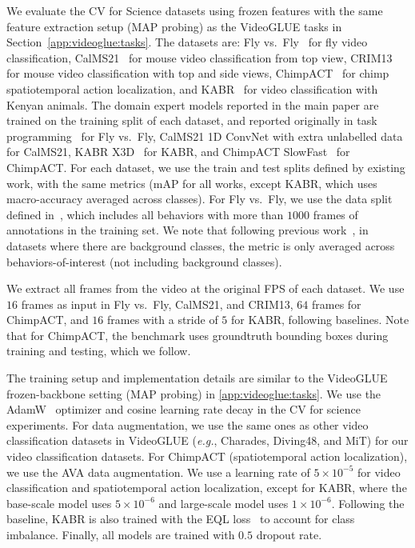 \documentclass{article}
\theoremstyle{plain}
\theoremstyle{definition}
\theoremstyle{remark}
\newcommand{\eg}{\textit{e.g.}\xspace}
\begin{document}
We evaluate the CV for Science datasets using frozen features with the same feature extraction setup (MAP probing) as the VideoGLUE tasks in Section~\ref{app:videoglue:tasks}. 
The datasets are: Fly vs.\ Fly~\cite{eyjolfsdottir2014detecting} for fly video classification, CalMS21~\cite{sun2021multi} for mouse video classification from top view, CRIM13~\cite{burgos2012social} for mouse video classification with top and side views, ChimpACT~\cite{ma2023chimpact} for chimp spatiotemporal action localization, and KABR~\cite{kholiavchenko2024kabr}  for video classification with Kenyan animals.
The domain expert models reported in the main paper are trained on the training split of each dataset, and reported originally in task programming~\cite{sun2021task} for Fly vs.\ Fly, CalMS21 1D ConvNet with extra unlabelled data~\cite{sun2021multi} for CalMS21, KABR X3D~\cite{kholiavchenko2024kabr} for KABR, and ChimpACT SlowFast~\cite{ma2023chimpact} for ChimpACT.
For each dataset, we use the train and test splits defined by existing work, with the same metrics (mAP for all works, except KABR, which uses macro-accuracy averaged across classes). For Fly vs.\ Fly, we use the data split defined in~\citet{sun2021task}, which includes all behaviors with more than $1000$ frames of annotations in the training set. We note that following previous work~\cite{sun2021multi,sun2021task}, in datasets where there are background classes, the metric is only averaged across behaviors-of-interest (not including background classes).

We extract all frames from the video at the original FPS of each dataset. We use $16$ frames as input in Fly vs.\ Fly, CalMS21, and CRIM13, $64$ frames for ChimpACT, and $16$ frames with a stride of $5$ for KABR, following baselines. Note that for ChimpACT, the benchmark uses groundtruth bounding boxes during training and testing, which we follow. 

The training setup and implementation details are similar to the VideoGLUE frozen-backbone setting (MAP probing) in \cref{app:videoglue:tasks}.
We use the AdamW~\cite{loshchilov2017adamw} optimizer and cosine learning rate decay in the CV for science experiments.
For data augmentation, we use the same ones as other video classification datasets in VideoGLUE (\eg, Charades, Diving48, and MiT) for our video classification datasets. For ChimpACT (spatiotemporal action localization), we use the AVA data augmentation. We use a learning rate of $5 \times 10^{-5}$ for video classification and spatiotemporal action localization, except for KABR, where the base-scale model uses $5 \times 10^{-6}$ and large-scale model uses $1 \times 10^{-6}$. Following the baseline, KABR is also trained with the EQL loss~\cite{tan2020equalization} to account for class imbalance. Finally, all models are trained with $0.5$ dropout rate. 
\end{document}
